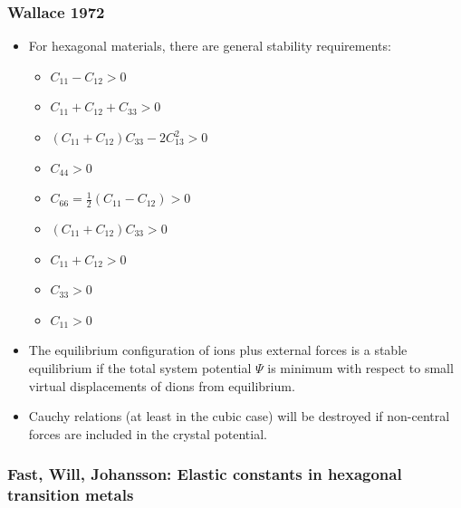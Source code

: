 \documentclass[11pt]{article}
\begin{document}
\subsubsection{Wallace 1972}
\label{sec-2-5-1}
\begin{itemize}
\item For hexagonal materials, there are general stability requirements:
\begin{itemize}
\item $C_{11} - C_{12} > 0$
\item $C_{11} + C_{12} + C_{33} > 0$
\item $( C_{11} + C_{12} ) C_{33} - 2C_{13}^{2} > 0$
\item $C_{44} > 0$
\item $C_{66} = \frac{1}{2}(C_{11} - C_{12}) > 0$
\item $( C_{11} + C_{12} )C_{33} > 0$
\item $C_{11} + C_{12} > 0$
\item $C_{33} > 0$
\item $C_{11} > 0$
\end{itemize}
\item The equilibrium configuration of ions plus external forces is a stable
equilibrium if the total system potential $\Psi$ is minimum with respect
to small virtual displacements of dions from equilibrium.
\item Cauchy relations (at least in the cubic case) will be destroyed if
non-central forces are included in the crystal potential.
\end{itemize}

\subsubsection{Fast, Will, Johansson: Elastic constants in hexagonal transition metals}
\label{sec-2-5-2}
\end{document}
